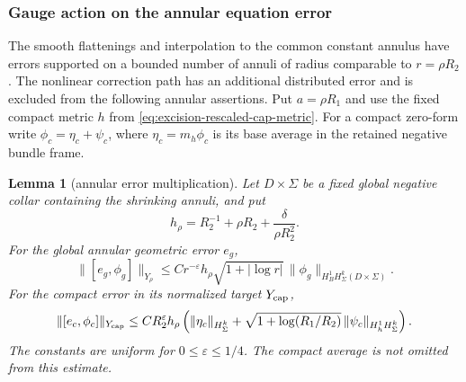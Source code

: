 \documentclass[11pt]{amsart}
\newtheorem{lemma}[theorem]{Lemma}
\theoremstyle{definition}
\theoremstyle{remark}
\theoremstyle{plain}
\begin{document}
\subsubsection{Gauge action on the annular equation error}

The smooth flattenings and interpolation to the common constant
annulus have errors supported on a bounded number of annuli
of radius comparable to $r=\rho R_2$.
The nonlinear correction path has an additional distributed
error and is excluded from the following annular assertions.
Put $a=\rho R_1$ and use the fixed compact metric $h$ from
\eqref{eq:excision-rescaled-cap-metric}.
For a compact zero-form write
$\phi_c=\eta_c+\psi_c$, where $\eta_c=m_h\phi_c$ is its
base average in the retained negative bundle frame.

\begin{lemma}[annular error multiplication]
\label{lem:excision-annular-multiplier}
Let $D\times\Sigma$ be a fixed global negative collar containing
the shrinking annuli, and put
\[
 h_\rho=R_2^{-1}+\rho R_2+\frac{\delta}{\rho R_2^2}.
\]
For the global annular geometric error $e_g$,
\begin{equation}\label{eq:excision-global-annular-multiplier}
 \|[e_g,\phi_g]\|_{Y_\rho}
 \leq Cr^{-\varepsilon}h_\rho
       \sqrt{1+|\log r|}\,
                        \|\phi_g\|_{H^1_BH^k_\Sigma(D\times\Sigma)}.
\end{equation}
For the compact error in its normalized target $Y_{\rm cap}$,
\begin{equation}\label{eq:excision-cap-annular-multiplier}
 \|[e_c,\phi_c]\|_{Y_{\rm cap}}
 \leq CR_2^\varepsilon h_\rho
 \left(\|\eta_c\|_{H^k_\Sigma}
       +\sqrt{1+\log(R_1/R_2)}\,
                                \|\psi_c\|_{H^1_hH^k_\Sigma}\right).
\end{equation}
The constants are uniform for $0\leq\varepsilon\leq1/4$.
The compact average is not omitted from this estimate.
\end{lemma}
\end{document}
